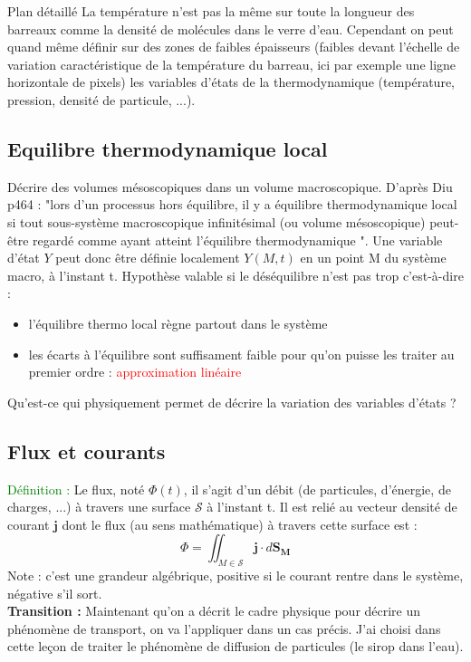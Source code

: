 \begin{reportBlock}{Plan détaillé}
La température n'est pas la même sur toute la longueur des barreaux comme la densité de molécules dans le verre d'eau. Cependant on peut quand même définir sur des zones de faibles épaisseurs (faibles devant l'échelle de variation caractéristique de la température du barreau, ici par exemple une ligne horizontale de pixels) les variables d'états de la thermodynamique (température, pression, densité de particule, ...).

\subsection{Equilibre thermodynamique local}
Décrire des volumes mésoscopiques dans un volume macroscopique. D'après Diu p464 : "lors d'un processus hors équilibre, il y a équilibre thermodynamique local si tout sous-système macroscopique infinitésimal (ou volume mésoscopique) peut-être regardé comme ayant atteint l'équilibre thermodynamique ". Une variable d'état $Y$ peut donc être définie localement $Y(M,t)$ en un point M du système macro, à l'instant t. Hypothèse valable si le déséquilibre \og n'est pas trop \fg c'est-à-dire :
\begin{itemize}
    \item l'équilibre thermo local règne partout dans le système
    \item les écarts à l'équilibre sont suffisament faible pour qu'on puisse les traiter au premier ordre : \textcolor{red}{approximation linéaire}
\end{itemize}

Qu'est-ce qui physiquement permet de décrire la variation des variables d'états ? 

\subsection{Flux et courants}
\textcolor{green}{Définition :} Le flux, noté $\Phi(t)$, il s'agit d'un débit (de particules, d'énergie, de charges, ...) à travers une surface $\mathcal{S}$ à l'instant t. Il est relié au vecteur densité de courant $\mathbf{j}$ dont le flux (au sens mathématique) à travers cette surface est :
\begin{equation}
    \Phi = \iint_{M\in\mathcal{S}}\mathbf{j}\cdot d\mathbf{S_M}
\end{equation}
Note : c'est une grandeur algébrique, positive si le courant rentre dans le système, négative s'il sort.\\

\textbf{Transition :} Maintenant qu'on a décrit le cadre physique pour décrire un phénomène de transport, on va l'appliquer dans un cas précis. J'ai choisi dans cette leçon de traiter le phénomène de diffusion de particules (le sirop dans l'eau).


\end{reportBlock}
